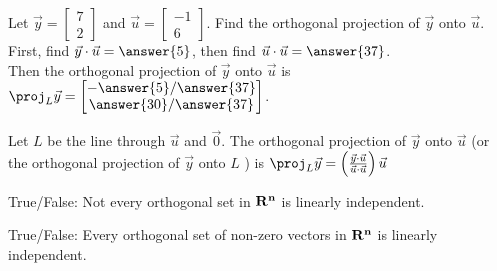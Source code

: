 \documentclass{ximera}
\newcommand{\RR}{\bf R}
\begin{document}
  	  		 \begin{question} Let $\vec{y} = \begin{bmatrix} 7\\2\end{bmatrix}$ and $\vec{u} = \begin{bmatrix}
  	  		 	-1\\6\end{bmatrix}$. Find the orthogonal projection of $\vec{y}$ onto $\vec{u}$.\\
  	  		 	
  	  		 	First, find $\vec{y}\cdot\vec{u} = \answer{5}$, then find $\vec{u}\cdot\vec{u} = \answer{37}$.\\
  	  		 	
  	  		 	Then the orthogonal projection of $\vec{y}$ onto $\vec{u}$ is ${\proj}_L\vec{y} = \begin{bmatrix} -\answer{5}/\answer{37} \\\answer{30}/\answer{37} \end{bmatrix}$.\\
  	  		 	
  	  		 	\begin{hint}
  	  		 	Let $L$ be the line through $\vec{u}$ and $\vec{0}$. The orthogonal projection of $\vec{y}$ onto $\vec{u}$ (or the orthogonal projection of $\vec{y}$ onto $L$ ) is ${\proj}_L\vec{y} = \left(\frac{\vec{y}\cdot\vec{u}}{\vec{u}\cdot\vec{u}}\right)\vec{u}$ 
  	  		 		\end{hint}
  	  		 	
  	  		 	\end{question}
  	  		       \begin{question}True/False: Not every orthogonal set in $\RR^n$ is linearly independent.\\
  	  		       	 	\begin{multipleChoice}
  	  		       	 	\end{multipleChoice}
  	  		       	
  	  		       	\end{question}
  	  		          \begin{question}True/False: Every orthogonal set of non-zero vectors in $\RR^n$ is linearly independent.\\
  	  		          	\begin{multipleChoice}
  	  		          		\choice[correct]{True}
  	  		          		\choice{False}
  	  		          	\end{multipleChoice}
  	  		          	
  	  		          \end{question}
\end{document}
